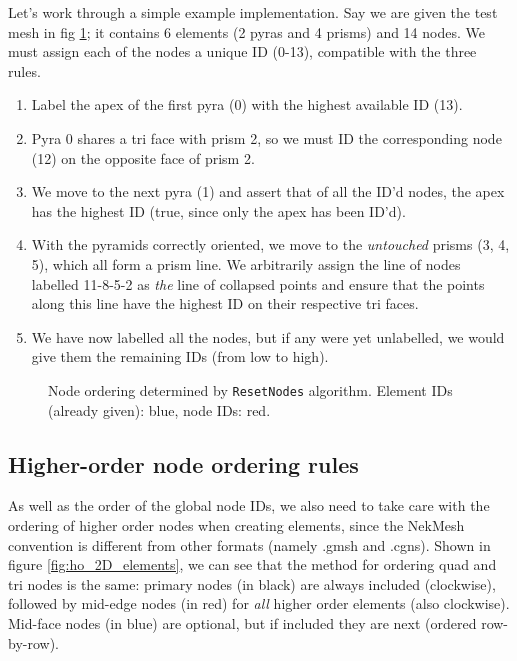 {Let's work through a simple example implementation. Say we are given the test mesh in fig \ref{fig:ResetNodes_example}; it contains 6 elements (2 pyras and 4 prisms) and 14 nodes. We must assign each of the nodes a unique ID (0-13), compatible with the three rules.

\begin{enumerate}
  \item{Label the apex of the first pyra (0) with the highest available ID (13).}
  \item{Pyra 0 shares a tri face with prism 2, so we must ID the corresponding node (12) on the opposite face of prism 2.}
  \item{We move to the next pyra (1) and assert that of all the ID'd nodes, the apex has the highest ID (true, since only the apex has been ID'd).}
  \item{With the pyramids correctly oriented, we move to the \textit{untouched} prisms (3, 4, 5), which all form a prism line. We arbitrarily assign the line of nodes labelled 11-8-5-2 as \textit{the} line of collapsed points and ensure that the points along this line have the highest ID on their respective tri faces.}
  \item{We have now labelled all the nodes, but if any were yet unlabelled, we would give them the remaining IDs (from low to high).}
\end{enumerate}

\begin{figure}[h!]
  \centering
  
  \caption{Node ordering determined by \texttt{ResetNodes} algorithm. Element IDs (already given): blue, node IDs: red.}
  \label{fig:ResetNodes_example}
\end{figure}

\subsection{Higher-order node ordering rules}
\label{sect:HO_node_ordering}
As well as the order of the global node IDs, we also need to take care
with the ordering of higher order nodes when creating elements, since
the NekMesh convention is different from other formats (namely .gmsh
and .cgns). Shown in figure \ref{fig:ho_2D_elements}, we can see that
the method for ordering quad and tri nodes is the same: primary nodes
(in black) are always included (clockwise), followed by mid-edge nodes
(in red) for \textit{all} higher order elements (also
clockwise). Mid-face nodes (in blue) are optional, but if included
they are next (ordered row-by-row).

}
